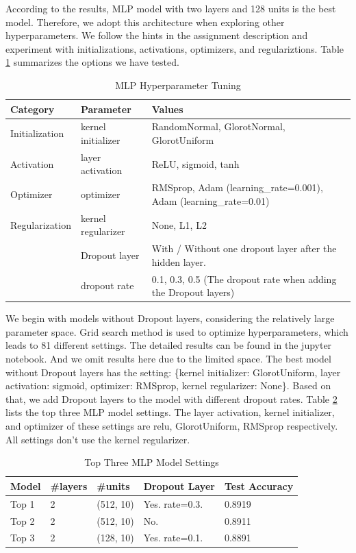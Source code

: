 \documentclass{article}
\begin{document}
\par
According to the results,  MLP model with two layers and 128 units is the best model. Therefore, we adopt this architecture when exploring other hyperparameters. We follow the hints in the assignment description and experiment with initializations, activations, optimizers, and regulariztions. Table \ref{tab:1-hy-mnist} summarizes the options we have tested.
\begin{table}[!ht]
    \centering
    \caption{MLP Hyperparameter Tuning}
    \label{tab:1-hy-mnist}
    \begin{tabular}{lll}
        \toprule
        \textbf{Category} & \textbf{Parameter} & \textbf{Values}\\
        \midrule
        Initialization & kernel initializer & RandomNormal, GlorotNormal, GlorotUniform\\
        Activation & layer activation & ReLU, sigmoid, tanh\\
        Optimizer & optimizer & RMSprop, Adam (learning_rate=0.001), Adam (learning_rate=0.01)\\
        Regularization & kernel regularizer & None, L1, L2\\
                       & Dropout layer & With / Without one dropout layer after the hidden layer.\\
                       & dropout rate & 0.1, 0.3, 0.5 (The dropout rate when adding the Dropout layers)\\
        \bottomrule
    \end{tabular}
\end{table}
\par
We begin with models without Dropout layers, considering the relatively large parameter space. Grid search method is used to optimize hyperparameters, which leads to 81 different settings. The detailed results can be found in the jupyter notebook. And we omit results here due to the limited space. The best model without Dropout layers has the setting: \{kernel initializer: GlorotUniform, layer activation: sigmoid, optimizer: RMSprop, kernel regularizer: None\}. Based on that, we add Dropout layers to the model with different dropout rates. Table \ref{tab:1-top3-mlp} lists the top three MLP model settings. The layer activation, kernel initializer, and optimizer of these settings are relu, GlorotUniform, RMSprop respectively. All settings don't use the kernel regularizer.
\begin{table}[!ht]
    \centering
    \caption{Top Three MLP Model Settings}
    \label{tab:1-top3-mlp}
    \begin{tabular}{lllll}
        \toprule
        \textbf{Model} & \textbf{\#layers} & \textbf{\#units} & \textbf{Dropout Layer} & \textbf{Test Accuracy}\\
        \midrule
        Top 1 & 2 & (512, 10) & Yes. rate=0.3. & 0.8919\\
        Top 2 & 2 & (512, 10) & No. & 0.8911\\
        Top 3 & 2 & (128, 10) & Yes. rate=0.1. & 0.8891\\
        \bottomrule
    \end{tabular}
\end{table}
\end{document}
